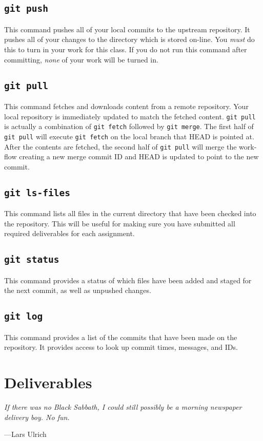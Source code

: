 \documentclass[11pt]{article}
\begin{document}
\subsection{\texttt{git push}}
This command pushes all of your local commits to the upstream repository. It
pushes all of your changes to the directory which is stored on-line. You \emph{must} do this to turn in your work for this class. If you do not run this command after committing, \emph{none} of your work will be turned in.

\subsection{\texttt{git pull}} This command fetches and downloads content from a remote repository. Your local repository is immediately updated to match the fetched content. \texttt{git pull} is actually a combination of \texttt{git fetch} followed by \texttt{git merge}. The first half of \texttt{git pull} will execute \texttt{git fetch} on the local branch that HEAD is pointed at. After the contents are fetched, the second half of \texttt{git pull} will merge the work-flow creating a new merge commit ID and HEAD is updated to point to the new commit.

\subsection{\texttt{git ls-files}}
This command lists all files in the current directory that have been checked
into the repository. This will be useful for making sure you have submitted all
required deliverables for each assignment.

\subsection{\texttt{git status}}
This command provides a status of which files have been added and staged for the next commit, as well as unpushed changes.

\subsection{\texttt{git log}}
This command provides a list of the commits that have been made on the repository. It provides access to look up commit times, messages, and IDs.


\section{Deliverables}
\epigraph{\emph{If there was no Black Sabbath, I could still possibly be a
morning newspaper delivery boy. No fun.}}{---Lars Ulrich}
\end{document}
